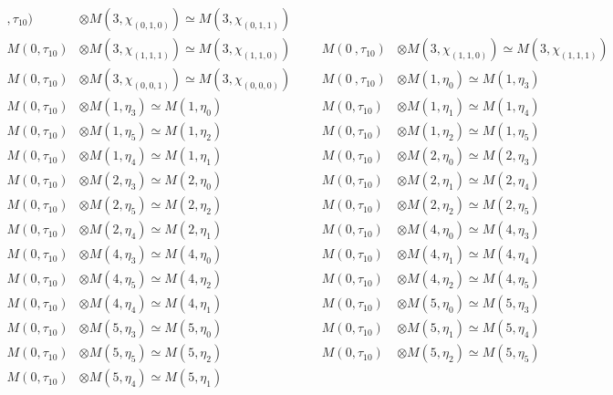 \begin{align*}
,\tau_{10}) &\otimes M(3,\chi_{(0,1,0)}) \simeq M(3,\chi_{(0,1,1)})\\
M(0,\tau_{10}) &\otimes M(3,\chi_{(1,1,1)}) \simeq M(3,\chi_{(1,1,0)}) &&& M(0\
,\tau_{10}) &\otimes M(3,\chi_{(1,1,0)}) \simeq M(3,\chi_{(1,1,1)})\\
M(0,\tau_{10}) &\otimes M(3,\chi_{(0,0,1)}) \simeq M(3,\chi_{(0,0,0)}) &&& M(0\
,\tau_{10}) &\otimes M(1,\eta_{0}) \simeq M(1,\eta_{3})\\
M(0,\tau_{10}) &\otimes M(1,\eta_{3}) \simeq M(1,\eta_{0}) &&& M(0,\tau_{10}) \
&\otimes M(1,\eta_{1}) \simeq M(1,\eta_{4})\\
M(0,\tau_{10}) &\otimes M(1,\eta_{5}) \simeq M(1,\eta_{2}) &&& M(0,\tau_{10}) \
&\otimes M(1,\eta_{2}) \simeq M(1,\eta_{5})\\
M(0,\tau_{10}) &\otimes M(1,\eta_{4}) \simeq M(1,\eta_{1}) &&& M(0,\tau_{10}) \
&\otimes M(2,\eta_{0}) \simeq M(2,\eta_{3})\\
M(0,\tau_{10}) &\otimes M(2,\eta_{3}) \simeq M(2,\eta_{0}) &&& M(0,\tau_{10}) \
&\otimes M(2,\eta_{1}) \simeq M(2,\eta_{4})\\
M(0,\tau_{10}) &\otimes M(2,\eta_{5}) \simeq M(2,\eta_{2}) &&& M(0,\tau_{10}) \
&\otimes M(2,\eta_{2}) \simeq M(2,\eta_{5})\\
M(0,\tau_{10}) &\otimes M(2,\eta_{4}) \simeq M(2,\eta_{1}) &&& M(0,\tau_{10}) \
&\otimes M(4,\eta_{0}) \simeq M(4,\eta_{3})\\
M(0,\tau_{10}) &\otimes M(4,\eta_{3}) \simeq M(4,\eta_{0}) &&& M(0,\tau_{10}) \
&\otimes M(4,\eta_{1}) \simeq M(4,\eta_{4})\\
M(0,\tau_{10}) &\otimes M(4,\eta_{5}) \simeq M(4,\eta_{2}) &&& M(0,\tau_{10}) \
&\otimes M(4,\eta_{2}) \simeq M(4,\eta_{5})\\
M(0,\tau_{10}) &\otimes M(4,\eta_{4}) \simeq M(4,\eta_{1}) &&& M(0,\tau_{10}) \
&\otimes M(5,\eta_{0}) \simeq M(5,\eta_{3})\\
M(0,\tau_{10}) &\otimes M(5,\eta_{3}) \simeq M(5,\eta_{0}) &&& M(0,\tau_{10}) \
&\otimes M(5,\eta_{1}) \simeq M(5,\eta_{4})\\
M(0,\tau_{10}) &\otimes M(5,\eta_{5}) \simeq M(5,\eta_{2}) &&& M(0,\tau_{10}) \
&\otimes M(5,\eta_{2}) \simeq M(5,\eta_{5})\\
M(0,\tau_{10}) &\otimes M(5,\eta_{4}) \simeq M(5,\eta_{1})\\
\end{align*}


